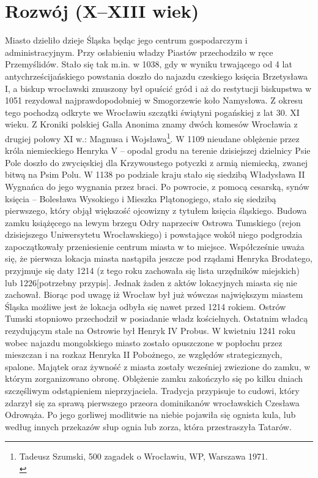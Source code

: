 \documentclass{article}
\begin{document}
\newpage
\section{Rozwój (X–XIII wiek)}
Miasto dzieliło dzieje Śląska będąc jego centrum gospodarczym i administracyjnym. Przy osłabieniu władzy Piastów przechodziło w ręce Przemyślidów. Stało się tak m.in. w 1038, gdy w wyniku trwającego od 4 lat antychrześcijańskiego powstania doszło do najazdu czeskiego księcia Brzetysława I, a biskup wrocławski zmuszony był opuścić gród i aż do restytucji biskupstwa w 1051 rezydował najprawdopodobniej w Smogorzewie koło Namysłowa. Z okresu tego pochodzą odkryte we Wrocławiu szczątki świątyni pogańskiej z lat 30. XI wieku. Z Kroniki polskiej Galla Anonima znamy dwóch komesów Wrocławia z drugiej połowy XI w.: Magnusa i Wojsława\footnote{Tadeusz Szumski, 500 zagadek o Wrocławiu, WP, Warszawa 1971.\\}.
\newline W 1109 nieudane oblężenie przez króla niemieckiego Henryka V – opodal grodu na terenie dzisiejszej dzielnicy Psie Pole doszło do zwycięskiej dla Krzywoustego potyczki z armią niemiecką, zwanej bitwą na Psim Polu.
\vspace{3mm} %
\newline W 1138 po podziale kraju stało się siedzibą Władysława II Wygnańca do jego wygnania przez braci. Po powrocie, z pomocą cesarską, synów księcia – Bolesława Wysokiego i Mieszka Plątonogiego, stało się siedzibą pierwszego, który objął większość ojcowizny z tytułem księcia śląskiego.
\vspace{3mm} %
\newline Budowa zamku książęcego na lewym brzegu Odry naprzeciw Ostrowa Tumskiego (rejon dzisiejszego Uniwersytetu Wrocławskiego) i powstające wokół niego podgrodzia zapoczątkowały przeniesienie centrum miasta w to miejsce. Współcześnie uważa się, że pierwsza lokacja miasta nastąpiła jeszcze pod rządami Henryka Brodatego, przyjmuje się daty 1214 (z tego roku zachowała się lista urzędników miejskich) lub 1226[potrzebny przypis]. Jednak żaden z aktów lokacyjnych miasta się nie zachował. Biorąc pod uwagę iż Wrocław był już wówczas największym miastem Śląska możliwe jest że lokacja odbyła się nawet przed 1214 rokiem. Ostrów Tumski stopniowo przechodził w posiadanie władz kościelnych. Ostatnim władcą rezydującym stale na Ostrowie był Henryk IV Probus.
\vspace{3mm} %
\newline W kwietniu 1241 roku wobec najazdu mongolskiego miasto zostało opuszczone w popłochu przez mieszczan i na rozkaz Henryka II Pobożnego, ze względów strategicznych, spalone. Majątek oraz żywność z miasta zostały wcześniej zwiezione do zamku, w którym zorganizowano obronę. Oblężenie zamku zakończyło się po kilku dniach szczęśliwym odstąpieniem nieprzyjaciela. Tradycja przypisuje to cudowi, który zdarzył się za sprawą pierwszego przeora dominikanów wrocławskich Czesława Odrowąża. Po jego gorliwej modlitwie na niebie pojawiła się ognista kula, lub według innych przekazów słup ognia lub zorza, która przestraszyła Tatarów.
\end{document}

